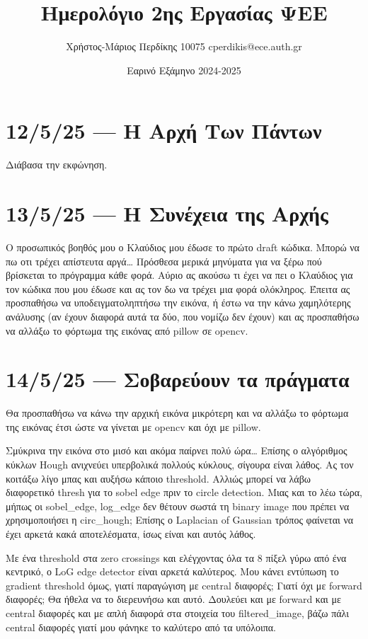 \documentclass{article}
\title{Ημερολόγιο 2ης Εργασίας ΨΕΕ}
\date{Εαρινό Εξάμηνο 2024-2025}
\author{Χρήστος-Μάριος Περδίκης 10075 cperdikis@ece.auth.gr}
\begin{document}
\maketitle

\section{12/5/25 --- Η Αρχή Των Πάντων}
Διάβασα την εκφώνηση.

\section{13/5/25 --- Η Συνέχεια της Αρχής}
Ο προσωπικός βοηθός μου ο Κλαύδιος μου έδωσε το πρώτο draft κώδικα.
Μπορώ να πω οτι τρέχει απίστευτα αργά\ldots{} Πρόσθεσα μερικά μηνύματα για
να ξέρω πού βρίσκεται το πρόγραμμα κάθε φορά. Αύριο ας ακούσω τι έχει να πει ο
Κλαύδιος για τον κώδικα που μου έδωσε και ας τον δω να τρέχει μια φορά 
ολόκληρος. Έπειτα ας προσπαθήσω να υποδειγματοληπτήσω την εικόνα, ή έστω
να την κάνω χαμηλότερης ανάλυσης (αν έχουν διαφορά αυτά τα δύο, που
νομίζω δεν έχουν) και ας προσπαθήσω να αλλάξω το φόρτωμα της εικόνας
από pillow σε opencv.

\section{14/5/25 --- Σοβαρεύουν τα πράγματα}
Θα προσπαθήσω να κάνω την αρχική εικόνα μικρότερη και να αλλάξω το 
φόρτωμα της εικόνας έτσι ώστε να γίνεται με opencv και όχι με pillow.


Σμύκρινα την εικόνα στο μισό και ακόμα παίρνει πολύ ώρα\ldots{} Επίσης ο 
αλγόριθμος κύκλων Hough ανιχνεύει υπερβολικά πολλούς κύκλους, σίγουρα
είναι λάθος. Ας τον κοιτάξω λίγο μπας και αυξήσω κάποιο threshold.
Αλλιώς μπορεί να λάβω διαφορετικό thresh για το sobel edge πριν το 
circle detection. Μιας και το λέω τώρα, μήπως οι sobel\_edge, log\_edge
δεν θέτουν σωστά τη binary image που πρέπει να χρησιμοποιήσει η
circ\_hough;
Επίσης ο Laplacian of Gaussian τρόπος φαίνεται να έχει αρκετά κακά 
αποτελέσματα, ίσως είναι και αυτός λάθος.

Με ένα threshold στα zero crossings και ελέγχοντας όλα τα 8 πίξελ γύρω
από ένα κεντρικό, ο LoG edge detector είναι αρκετά καλύτερος. Μου
κάνει εντύπωση το gradient threshold όμως, γιατί παραγώγιση με central 
διαφορές; Γιατί όχι με forward διαφορές; Θα ήθελα να το διερευνήσω και αυτό.
Δουλεύει και με forward και με central διαφορές και με απλή διαφορά στα στοιχεία
του filtered\_image, βάζω πάλι central διαφορές γιατί μου φάνηκε το καλύτερο 
από τα υπόλοιπα.
\end{document}

